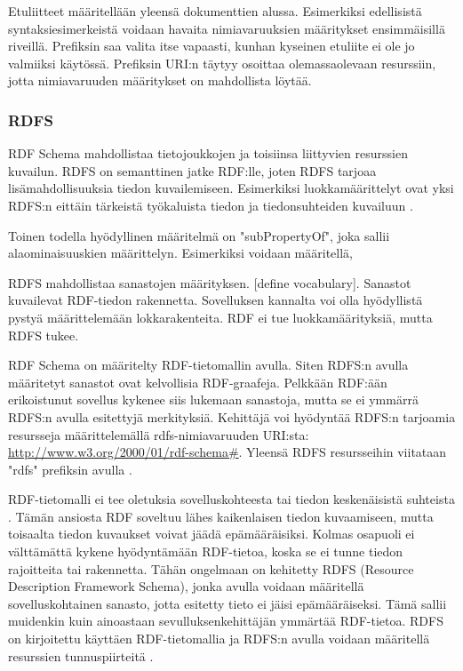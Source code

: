 \documentclass[finnish, 12pt, a4paper, elec, utf8, pdfa, online]{aaltothesis}
\begin{document}
Etuliitteet määritellään yleensä dokumenttien alussa. Esimerkiksi edellisistä syntaksiesimerkeistä voidaan havaita nimiavaruuksien määritykset ensimmäisillä riveillä. Prefiksin saa valita itse vapaasti, kunhan kyseinen etuliite ei ole jo valmiiksi käytössä. Prefiksin URI:n täytyy osoittaa olemassaolevaan resurssiin, jotta nimiavaruuden määritykset on mahdollista löytää.


\subsubsection{RDFS}


RDF Schema mahdollistaa tietojoukkojen ja toisiinsa liittyvien resurssien kuvailun. RDFS on semanttinen jatke RDF:lle, joten RDFS tarjoaa lisämahdollisuuksia tiedon kuvailemiseen. Esimerkiksi luokkamäärittelyt ovat yksi RDFS:n eittäin tärkeistä työkaluista tiedon ja tiedonsuhteiden kuvailuun \cite{W3C_RDFS2}.


Toinen todella hyödyllinen määritelmä on "subPropertyOf", joka sallii alaominaisuuskien määrittelyn. Esimerkiksi voidaan määritellä,



RDFS mahdollistaa sanastojen määrityksen. [define vocabulary]. Sanastot kuvailevat RDF-tiedon rakennetta. Sovelluksen kannalta voi olla hyödyllistä pystyä määrittelemään lokkarakenteita. RDF ei tue luokkamäärityksiä, mutta RDFS tukee.
\cite{RDF_specification_old}


RDF Schema on määritelty RDF-tietomallin avulla. Siten RDFS:n avulla määritetyt sanastot ovat kelvollisia RDF-graafeja. Pelkkään RDF:ään erikoistunut sovellus kykenee siis lukemaan sanastoja, mutta se ei ymmärrä RDFS:n avulla esitettyjä merkityksiä. Kehittäjä voi hyödyntää RDFS:n tarjoamia resursseja määrittelemällä rdfs-nimiavaruuden URI:sta: \url{http://www.w3.org/2000/01/rdf-schema#}. Yleensä RDFS resursseihin viitataan "rdfs" prefiksin avulla \cite{RDF_specification_old}.

RDF-tietomalli ei tee oletuksia sovelluskohteesta tai tiedon keskenäisistä suhteista \cite{Antoniou}. Tämän ansiosta RDF soveltuu lähes kaikenlaisen tiedon kuvaamiseen, mutta toisaalta tiedon kuvaukset voivat jäädä epämääräisiksi. Kolmas osapuoli ei välttämättä kykene hyödyntämään RDF-tietoa, koska se ei tunne tiedon rajoitteita tai rakennetta. Tähän ongelmaan on kehitetty RDFS (Resource Description Framework Schema), jonka avulla voidaan määritellä sovelluskohtainen sanasto, jotta esitetty tieto ei jäisi epämääräiseksi. Tämä sallii muidenkin kuin ainoastaan sevulluksenkehittäjän ymmärtää RDF-tietoa. RDFS on kirjoitettu käyttäen RDF-tietomallia ja RDFS:n avulla voidaan määritellä resurssien tunnuspiirteitä \cite{W3C_RDFS2}.
\end{document}

